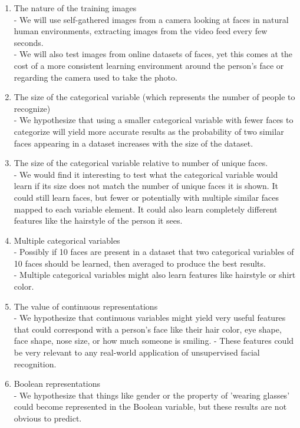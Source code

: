 \documentclass{article}
\begin{document}
\begin{enumerate}
\item The nature of the training images\\
    - We will use self-gathered images from a camera looking at faces in natural human environments, extracting images from the video feed every few seconds.\\
    - We will also test images from online datasets of faces, yet this comes at the cost of a more consistent learning environment around the person's face or regarding the camera used to take the photo. 
\item The size of the categorical variable (which represents the number of people to recognize)\\
    - We hypothesize that using a smaller categorical variable with fewer faces to categorize will yield more accurate results as the probability of two similar faces appearing in a dataset increases with the size of the dataset.
\item The size of the categorical variable relative to number of unique faces.\\
    - We would find it interesting to test what the categorical variable would learn if its size does not match the number of unique faces it is shown.  It could still learn faces, but fewer or potentially with multiple similar faces mapped to each variable element.  It could also learn completely different features like the hairstyle of the person it sees. 
\item Multiple categorical variables\\
    - Possibly if 10 faces are present in a dataset that two categorical variables of 10 faces should be learned, then averaged to produce the best results. \\
    - Multiple categorical variables might also learn features like hairstyle or shirt color.
\item The value of continuous representations \\
    - We hypothesize that continuous variables might yield very useful features that could correspond with a person's face like their hair color, eye shape, face shape, nose size, or how much someone is smiling.  
    - These features could be very relevant to any real-world application of unsupervised facial recognition. 
\item Boolean representations\\
    - We hypothesize that things like gender or the property of 'wearing glasses' could become represented in the Boolean variable, but these results are not obvious to predict. 
\end{enumerate}
\end{document}
